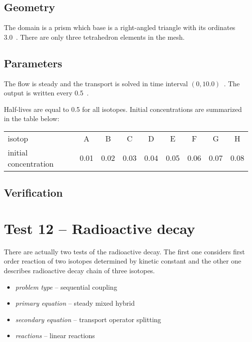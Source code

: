 \subsection*{Geometry}
The domain is a prism which base is a right-angled triangle with its ordinates 3.0~. 
There are only three tetrahedron elements in the mesh.

\subsection*{Parameters}
The flow is steady and the transport is solved in time interval $(0,10.0)$~. The output is written every 0.5~.

Half-lives are equal to 0.5 for all isotopes. Initial concentrations are summarized in the table below:
  \begin{center}
    \begin{tabular}[c]{|l|c|c|c|c|c|c|c|c|}
      \hline
      isotop & A & B  & C & D & E & F & G & H \\[4pt]
      initial concentration & 0.01 & 0.02 & 0.03 & 0.04 & 0.05 & 0.06 & 0.07 & 0.08 \\[4pt]
      \hline
    \end{tabular}
  \end{center}


\subsection*{Verification}



\section{Test 12 -- Radioactive decay}
There are actually two tests of the radioactive decay. The first one considers first order reaction of two isotopes 
determined by kinetic constant and the other one describes radioactive decay chain of three isotopes.

\begin{itemize} 
    \item \emph{problem type} -- sequential coupling
    \item \emph{primary equation} -- steady mixed hybrid
    \item \emph{secondary equation} -- transport operator splitting
    \item \emph{reactions} -- linear reactions
  \end{itemize}

